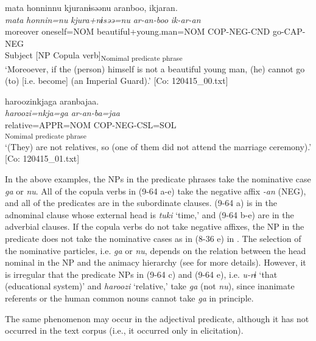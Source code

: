 \ex  %
     \glll mata  {\textbar}honnin{\textbar}nu  kjuranɨsəənu   aranboo,  ikjaran.\\
      \textit{mata}  \textit{honnin=nu}  \textit{kjura+nɨsəə=nu}  \textit{ar-an-boo}  \textit{ik-ar-an}\\                                                                 
      moreover  oneself=NOM  beautiful+young.man=NOM              COP-NEG-CND  go-CAP-NEG\\                                                                 
        Subject  [NP                                              Copula verb]\textsubscript{Nomimal predicate phrase}\\
    \glt ‘Moreoever, if the (person) himself is not a beautiful young man, (he) cannot go (to) [i.e. become] (an Imperial Guard).’   [Co: 120415\_00.txt]

\ex %
\gllll   haroozinkjaga  aranbajaa.\\
      \textit{haroozi=nkja=ga}  \textit{ar-an-ba=jaa}\\
      relative=APPR=NOM  COP-NEG-CSL=SOL\\
      [NP  Copula verb]\textsubscript{Nomimal predicate phrase}\\
      \glt       ‘(They) are not relatives, so (one of them did not attend the marriage ceremony).’ [Co: 120415\_01.txt]
    \z
\z

In the above examples, the NPs in the predicate phrases take the nominative case \textit{ga} or \textit{nu}. All of the copula verbs in (9-64 a-e) take the negative affix \textit{{}-an} (NEG), and all of the predicates are in the subordinate clauses. (9-64 a) is in the adnominal clause whose external head is \textit{tuki} ‘time,’ and (9-64 b-e) are in the adverbial clauses. If the copula verbs do not take negative affixes, the NP in the predicate does not take the nominative cases as in (8-36 e) in . The selection of the nominative particles, i.e. \textit{ga} or \textit{nu}, depends on the relation between the head nominal in the NP and the animacy hierarchy (see  for more details). However, it is irregular that the predicate NPs in (9-64 c) and (9-64 e), i.e. \textit{u-rɨ} ‘that (educational system)’ and \textit{haroozi} ‘relative,’ take \textit{ga} (not \textit{nu}), since inanimate referents or the human common nouns cannot take \textit{ga} in principle.

  The same phenomenon may occur in the adjectival predicate, although it has not occurred in the text corpus (i.e., it occurred only in elicitation).

